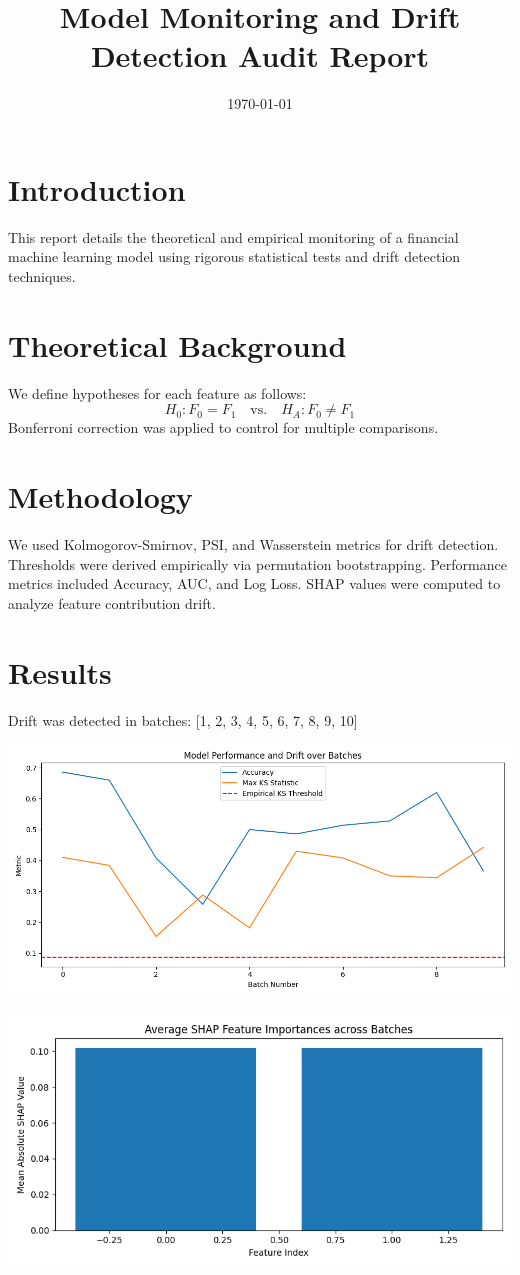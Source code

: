 \documentclass{article}
\title{Model Monitoring and Drift Detection Audit Report}
\author{}
\date{\today}
\begin{document}
\maketitle

\section*{Introduction}
This report details the theoretical and empirical monitoring of a financial machine learning model using rigorous statistical tests and drift detection techniques.

\section*{Theoretical Background}
We define hypotheses for each feature as follows:
\[
H_0: F_0 = F_1 \quad \text{vs.} \quad H_A: F_0 \neq F_1
\]
Bonferroni correction was applied to control for multiple comparisons.

\section*{Methodology}
We used Kolmogorov-Smirnov, PSI, and Wasserstein metrics for drift detection. Thresholds were derived empirically via permutation bootstrapping. Performance metrics included Accuracy, AUC, and Log Loss. SHAP values were computed to analyze feature contribution drift.

\section*{Results}
Drift was detected in batches: [1, 2, 3, 4, 5, 6, 7, 8, 9, 10] 

\includegraphics[width=\linewidth]{monitoring_plot.png}

\includegraphics[width=\linewidth]{shap_importance.png}
\end{document}
